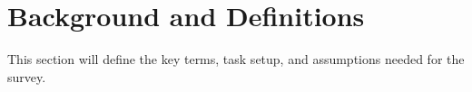 \section{Background and Definitions}

This section will define the key terms, task setup, and assumptions needed for the survey.

